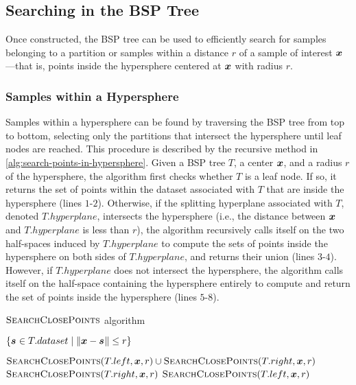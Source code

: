 \subsection{Searching in the BSP Tree}
\label{subsec:Searching-bsp-tree}
Once constructed, the BSP tree can be used to efficiently search for samples belonging to a partition or samples within a distance $r$ of a sample of interest  $\vinput$—that is, points inside the hypersphere centered at $\vinput$ with radius $r$.

\subsubsection{Samples within a Hypersphere}
\label{subsub:samples-within-hypersphere}

Samples within a hypersphere can be found by traversing the BSP tree from top to bottom, selecting only the partitions that intersect the hypersphere until leaf nodes are reached. This procedure is described by the recursive method in \autoref{alg:search-points-in-hypersphere}. Given a BSP tree $T$, a center $\vinput$, and a radius $r$ of the hypersphere, the algorithm first checks whether $T$ is a leaf node. If so, it returns the set of points within the dataset associated with $T$ that are inside the hypersphere (lines $1$-$2$). Otherwise, if the splitting hyperplane associated with $T$, denoted $T.hyperplane$, intersects the hypersphere (i.e., the distance between $\vinput$ and $T.hyperplane$ is less than $r$), the algorithm recursively calls itself on the two half-spaces induced by $T.hyperplane$ to compute the sets of points inside the hypersphere on both sides of $T.hyperplane$, and returns their union (lines $3$-$4$). However, if $T.hyperplane$ does not intersect the hypersphere, the algorithm calls itself on the half-space containing the hypersphere entirely to compute and return the set of points inside the hypersphere (lines $5$-$8$).

\begin{algorithm}[h]
	\caption[$\algtitle{SearchClosePoints}$ algorithm]{$\algtitle{SearchClosePoints}$ algorithm}
	\label{alg:search-points-in-hypersphere}
	\begin{algorithmic}[1]

      \State \Return $\{\sample[] \in T.dataset \mid \norm{\vinput - \sample[]} \le r\}$
    \EndIf

      \State \Return $\algtitle{SearchClosePoints}(T.left,\vinput,r) \cup \algtitle{SearchClosePoints}(T.right,\vinput, r)$
      \State \Return $\algtitle{SearchClosePoints}(T.right,\vinput,r)$
    \Else
      \State \Return $\algtitle{SearchClosePoints}(T.left,\vinput,r)$
    \EndIf
	\end{algorithmic}
\end{algorithm}

